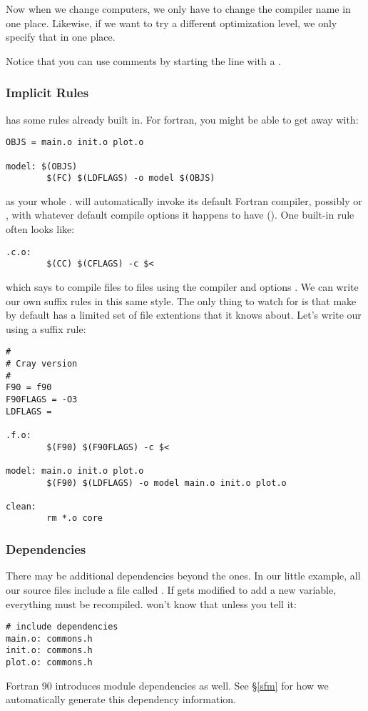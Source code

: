 Now when we change computers, we only have to change the compiler name
in one place. Likewise, if we want to try a different optimization level,
we only specify that in one place.

Notice that you can use comments by starting the line with a \code{\#}.

\subsubsection{Implicit Rules}

 has some rules already built in. For fortran, you might be able
to get away with:
\begin{verbatim}
OBJS = main.o init.o plot.o

model: $(OBJS)
        $(FC) $(LDFLAGS) -o model $(OBJS)
\end{verbatim}
as your whole .  will automatically invoke its
default Fortran compiler, possibly  or , with whatever
default compile options it happens to have (). One built-in
rule often looks like:
\begin{verbatim}
.c.o:
        $(CC) $(CFLAGS) -c $<
\end{verbatim}
which says to compile  files to  files using the
compiler  and options . We can write our own suffix
rules in this same style.  The only thing to watch for is that make by
default has a limited set of file extentions that it knows about. Let's
write our  using a suffix rule:
\begin{verbatim}
#
# Cray version
#
F90 = f90
F90FLAGS = -O3
LDFLAGS =

.f.o:
        $(F90) $(F90FLAGS) -c $<

model: main.o init.o plot.o
        $(F90) $(LDFLAGS) -o model main.o init.o plot.o

clean:
        rm *.o core
\end{verbatim}

\subsubsection{Dependencies}

There may be additional dependencies beyond the  ones.
In our little example, all our source files include a file called
. If  gets modified to add a new variable,
everything must be recompiled.  won't know that unless you
tell it:
\begin{verbatim}
# include dependencies
main.o: commons.h
init.o: commons.h
plot.o: commons.h
\end{verbatim}
Fortran 90 introduces module dependencies as well. See \S\ref{sfm}
for how we automatically generate this dependency information.


